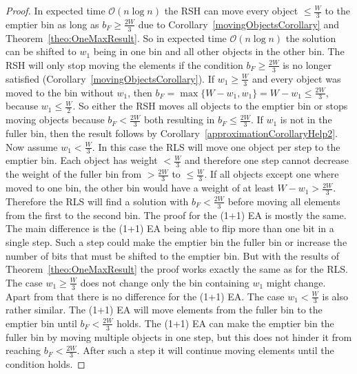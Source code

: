 \begin{proof}
    In expected time $\mathcal{O}(n\log{}n)$ the RSH can move every object $\le \frac{W}{3}$ to the emptier bin as long as $b_F \ge \frac{2W}{3}$ due to Corollary~\ref{movingObjectsCorollary} and Theorem~\ref{theo:OneMaxResult}.
    So in expected time $\mathcal{O}(n\log{}n)$ the solution can be shifted to $w_1$ being in one bin and all other objects in the other bin.
    The RSH will only stop moving the elements if the condition $b_F \ge \frac{2W}{3}$ is no longer satisfied (Corollary~\ref{movingObjectsCorollary}).
    If \(w_1 \ge \frac{W}{3}\) and every object was moved to the bin without $w_1$, then \(b_F = \max\{W-w_1, w_1\} = W-w_1 \le \frac{2W}{3}\), because \(w_1 \le \frac{W}{2}\).
    So either the RSH moves all objects to the emptier bin or stops moving objects because $b_F < \frac{2W}{3}$ both resulting in $b_F \le \frac{2W}{3}$.
    If $w_1$ is not in the fuller bin, then the result follows by Corollary~\ref{approximationCorollaryHelp2}.\newline
    Now assume \(w_1 < \frac{W}{3}\).
    In this case the RLS will move one object per step to the emptier bin.
    Each object has weight $< \frac{W}{3}$ and therefore one step cannot decrease the weight of the fuller bin from $> \frac{2W}{3}$ to $\le \frac{W}{3}$.
    If all objects except one where moved to one bin, the other bin would have a weight of at least \(W-w_1 > \frac{2W}{3}\).
    Therefore the RLS will find a solution with $b_F < \frac{2W}{3}$ before moving all elements from the first to the second bin.\newline
    The proof for the (1+1) EA is mostly the same.
    The main difference is the (1+1) EA being able to flip more than one bit in a single step.
    Such a step could make the emptier bin the fuller bin or increase the number of bits that must be shifted to the emptier bin.
    But with the results of Theorem~\ref{theo:OneMaxResult} the proof works exactly the same as for the RLS.
    The case \(w_1 \ge \frac{W}{3}\) does not change only the bin containing $w_1$ might change.
    Apart from that there is no difference for the (1+1) EA.
    The case $w_1 < \frac{W}{3}$ is also rather similar.
    The (1+1) EA will move elements from the fuller bin to the emptier bin until $b_F < \frac{2W}{3}$ holds. The (1+1) EA can make the emptier bin the fuller bin by moving multiple objects in one step, but this does not hinder it from reaching $b_F < \frac{2W}{3}$. After such a step it will continue moving elements until the condition holds.
\end{proof}

